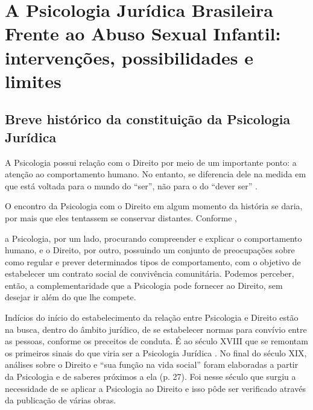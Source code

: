 
\chapter{A Psicologia Jurídica Brasileira Frente ao Abuso Sexual Infantil: intervenções, possibilidades e limites}

\section{Breve histórico da constituição da Psicologia Jurídica}

A Psicologia possui relação com o Direito por meio de um importante ponto: a atenção ao comportamento humano. No entanto, se diferencia dele na medida em que está voltada para o mundo do ``ser'', não para o do ``dever ser'' .

O encontro da Psicologia com o Direito em algum momento da história se daria, por mais que eles tentassem se conservar distantes. Conforme ,

\begin{citacao}
	a Psicologia, por um lado, procurando compreender e explicar o comportamento humano, e o Direito, por outro, possuindo um conjunto de preocupações sobre como regular e prever determinados tipos de comportamento, com o objetivo de estabelecer um contrato social de convivência comunitária. Podemos perceber, então, a complementaridade que a Psicologia pode fornecer ao Direito, sem desejar ir além do que lhe compete.
\end{citacao}

Indícios do início do estabelecimento da relação entre Psicologia e Direito estão na busca, dentro do âmbito jurídico, de se estabelecer normas para convívio entre as pessoas, conforme os preceitos de conduta. É ao século XVIII que se remontam os primeiros sinais do que viria ser a Psicologia Jurídica \cite{JESUS2001}. No final do século XIX, análises sobre o Direito e ``sua função na vida social'' foram elaboradas a partir da Psicologia e de saberes próximos a ela (p. 27). Foi nesse século que surgiu a necessidade de se aplicar a Psicologia ao Direito e isso pôde ser verificado através da publicação de várias obras.\footnotemark


